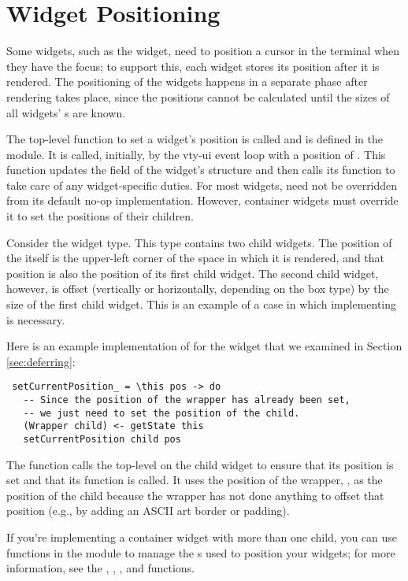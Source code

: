 \section{Widget Positioning}

Some widgets, such as the  widget, need to position a cursor
in the terminal when they have the focus; to support this, each widget
stores its position after it is rendered.  The positioning of the
widgets happens in a separate phase after rendering takes place, since
the positions cannot be calculated until the sizes of all widgets'
s are known.

The top-level function to set a widget's position is called
 and is defined in the  module.  It is
called, initially, by the vty-ui event loop with a position of .  This function updates the  field of the
widget's  structure and then calls its
 function to take care of any widget-specific
duties.  For most widgets,  need not be
overridden from its default no-op implementation.  However, container
widgets must override it to set the positions of their children.

Consider the  widget type.  This type contains two child
widgets.  The position of the  itself is the upper-left corner
of the space in which it is rendered, and that position is also the
position of its first child widget.  The second child widget, however,
is offset (vertically or horizontally, depending on the box type) by
the size of the first child widget.  This is an example of a case in
which implementing  is necessary.

Here is an example implementation of  for the
 widget that we examined in Section \ref{sec:deferring}:

\begin{verbatim}
 setCurrentPosition_ = \this pos -> do
   -- Since the position of the wrapper has already been set,
   -- we just need to set the position of the child.
   (Wrapper child) <- getState this
   setCurrentPosition child pos
\end{verbatim}

The function calls the top-level  on the child
widget to ensure that its position is set and that its
 function is called.  It uses the position of
the wrapper, , as the position of the child because the
wrapper has not done anything to offset that position (e.g., by adding
an ASCII art border or padding).

If you're implementing a container widget with more than one child,
you can use functions in the  module to manage the
s used to position your widgets; for more
information, see the , , ,
and  functions.
